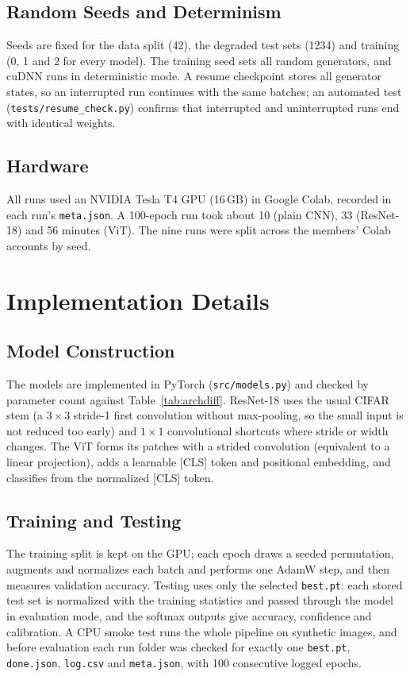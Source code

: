 \documentclass[conference]{IEEEtran}
\begin{document}
\subsection{Random Seeds and Determinism}\label{sec:seeds}
Seeds are fixed for the data split (42), the degraded test sets (1234) and training (0, 1 and 2 for every model). The training seed sets all random generators, and cuDNN runs in deterministic mode. A resume checkpoint stores all generator states, so an interrupted run continues with the same batches; an automated test (\texttt{tests/resume\_check.py}) confirms that interrupted and uninterrupted runs end with identical weights.

\subsection{Hardware}
All runs used an NVIDIA Tesla T4 GPU (16\,GB) in Google Colab, recorded in each run's \texttt{meta.json}. A 100-epoch run took about 10 (plain CNN), 33 (ResNet-18) and 56 minutes (ViT). The nine runs were split across the members' Colab accounts by seed.

\section{Implementation Details}

\subsection{Model Construction}
The models are implemented in PyTorch (\texttt{src/models.py}) and checked by parameter count against Table~\ref{tab:archdiff}. ResNet-18 uses the usual CIFAR stem (a $3\times3$ stride-1 first convolution without max-pooling, so the small input is not reduced too early) and $1\times1$ convolutional shortcuts where stride or width changes. The ViT forms its patches with a strided convolution (equivalent to a linear projection), adds a learnable [CLS] token and positional embedding, and classifies from the normalized [CLS] token.

\subsection{Training and Testing}
The training split is kept on the GPU; each epoch draws a seeded permutation, augments and normalizes each batch and performs one AdamW step, and then measures validation accuracy. Testing uses only the selected \texttt{best.pt}: each stored test set is normalized with the training statistics and passed through the model in evaluation mode, and the softmax outputs give accuracy, confidence and calibration. A CPU smoke test runs the whole pipeline on synthetic images, and before evaluation each run folder was checked for exactly one \texttt{best.pt}, \texttt{done.json}, \texttt{log.csv} and \texttt{meta.json}, with 100 consecutive logged epochs.
\end{document}
